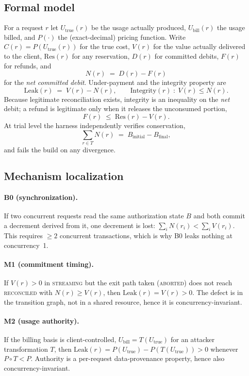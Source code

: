 \subsection{Formal model}

For a request $r$ let $U_{\text{true}}(r)$ be the usage actually produced,
$U_{\text{bill}}(r)$ the usage billed, and $P(\cdot)$ the (exact-decimal) pricing
function. Write $C(r)=P(U_{\text{true}}(r))$ for the true cost, $V(r)$ for the value
actually delivered to the client, $\mathrm{Res}(r)$ for any reservation, $D(r)$ for
committed debits, $F(r)$ for refunds, and
\[
N(r) \;=\; D(r)-F(r)
\]
for the \emph{net committed debit}. Under-payment and the integrity property are
\[
\mathrm{Leak}(r) \;=\; V(r)-N(r),
\qquad
\mathrm{Integrity}(r)\;:\;V(r)\le N(r).
\]
Because legitimate reconciliation exists, integrity is an inequality on the
\emph{net} debit; a refund is legitimate only when it releases the unconsumed portion,
\[
F(r)\;\le\;\mathrm{Res}(r)-V(r).
\]
At trial level the harness independently verifies conservation,
\[
\textstyle\sum_{r\in T} N(r) \;=\; B_{\text{initial}}-B_{\text{final}},
\]
and fails the build on any divergence.

\subsection{Mechanism localization}

\paragraph{B0 (synchronization).} If two concurrent requests read the same
authorization state $B$ and both commit a decrement derived from it, one decrement is
lost:
$\sum_i N(r_i) < \sum_i V(r_i)$. This requires $\ge 2$ concurrent transactions, which
is why B0 leaks nothing at concurrency~1.

\paragraph{M1 (commitment timing).} If $V(r)>0$ in \textsc{streaming} but the exit
path taken (\textsc{aborted}) does not reach \textsc{reconciled} with $N(r)\ge V(r)$,
then $\mathrm{Leak}(r)=V(r)>0$. The defect is in the transition graph, not in a shared
resource, hence it is concurrency-invariant.

\paragraph{M2 (usage authority).} If the billing basis is client-controlled,
$U_{\text{bill}}=T(U_{\text{true}})$ for an attacker transformation $T$, then
$\mathrm{Leak}(r)=P(U_{\text{true}})-P(T(U_{\text{true}}))>0$ whenever $P\circ T<P$.
Authority is a per-request data-provenance property, hence also
concurrency-invariant.

